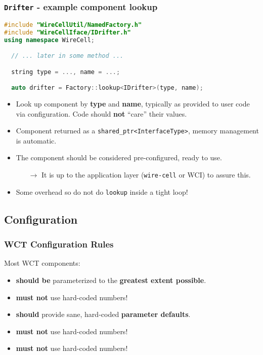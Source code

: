 \documentclass[xcolor=dvipsnames]{beamer}
\begin{document}
\begin{frame}[fragile]
  \frametitle{\texttt{Drifter} - example component lookup}


\begin{lstlisting}[language=C++]
#include "WireCellUtil/NamedFactory.h"
#include "WireCellIface/IDrifter.h"
using namespace WireCell;

  // ... later in some method ...

  string type = ..., name = ...;

  auto drifter = Factory::lookup<IDrifter>(type, name);
\end{lstlisting}


  \footnotesize
  \begin{itemize}
  \item Look up component by \textbf{type} and \textbf{name}, typically as provided to user code via configuration.  Code should \textbf{not} ``care'' their values.
  \item Component returned as a \texttt{shared\_ptr<InterfaceType>},
    memory management is automatic.
  \item The component should be considered pre-configured, ready to use.
    \begin{itemize}\scriptsize
    \item[$\to$] It is up to the application layer (\texttt{wire-cell} or
      WCI) to assure this.
    \end{itemize}
  \item Some overhead so do not do \texttt{lookup} inside a tight loop!
  \end{itemize}
\end{frame}

\subsection{Configuration}


\begin{frame}
  \tableofcontents[
  currentsection,
  currentsubsection,        
  subsectionstyle=show/shaded/hide]
\end{frame}

\begin{frame}
  \frametitle{WCT Configuration Rules}

  Most WCT components:
  \begin{itemize}
  \item \textbf{should be} parameterized to the \textbf{greatest extent possible}.
  \item \textbf{must not} use hard-coded numbers!
  \item \textbf{should} provide sane, hard-coded \textbf{parameter defaults}.
  \item \textbf{must not} use hard-coded numbers!
  \item \textbf{must not} use hard-coded numbers!
  \end{itemize}

\end{frame}
\end{document}
